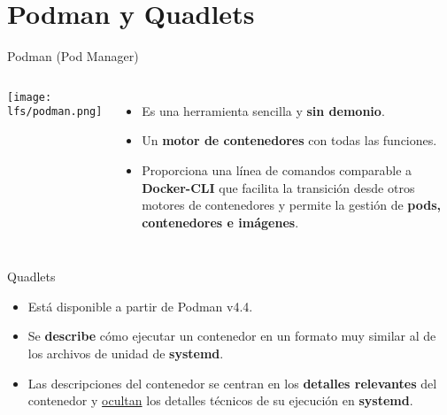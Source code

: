 
\section{Podman y Quadlets}

\begin{frame}[c]{Podman (Pod Manager)}
    \begin{columns}
        \begin{center}
            \texttt{[image: lfs/podman.png]}
        \end{center}
        \begin{itemize}
          \item Es una herramienta sencilla y \textbf{sin demonio}.
          \pausa
          \item Un \textbf{motor de contenedores} con todas las funciones.
          \pausa
          \item Proporciona una línea de comandos comparable a
            \textbf{Docker-CLI}
            que facilita la transición desde otros motores de contenedores
            y permite la gestión de \textbf{pods, contenedores e imágenes}.
        \end{itemize}
    \end{columns}
\end{frame}

\begin{frame}[c]{Quadlets}
  \begin{itemize}
    \item Está disponible a partir de Podman v4.4.
    \pausa
    \item Se \textbf{describe} cómo ejecutar un contenedor en un formato
      muy similar al de los archivos de unidad de \textbf{systemd}.
    \pausa
    \item Las descripciones del contenedor se centran en los
      \textbf{detalles relevantes} del contenedor y \underline{ocultan}
      los detalles técnicos de su ejecución en \textbf{systemd}.
  \end{itemize}
\end{frame}

